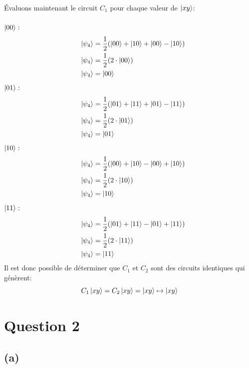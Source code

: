 \documentclass{article}
\begin{document}
Évaluons maintenant le circuit $C_1$ pour chaque valeur de $\ket{xy}$: \\ \\
$\ket{00}:$ \\
\begin{align*}
&&      \ket{\psi_4} &= \frac{1}{2}(\ket{00} + \ket{10} + \ket{00} - \ket{10}) \\
&&      \ket{\psi_4} &= \frac{1}{2}(2 \cdot \ket{00}) \\
&&      \ket{\psi_4} &= \ket{00} \\
\end{align*}
$\ket{01}:$ \\
\begin{align*}
&&      \ket{\psi_4} &= \frac{1}{2}(\ket{01} + \ket{11} + \ket{01} - \ket{11}) \\
&&      \ket{\psi_4} &= \frac{1}{2}(2 \cdot \ket{01}) \\
&&      \ket{\psi_4} &= \ket{01} \\
\end{align*}
$\ket{10}:$ \\
\begin{align*}
&&      \ket{\psi_4} &= \frac{1}{2}(\ket{00} + \ket{10} - \ket{00} + \ket{10}) \\
&&      \ket{\psi_4} &= \frac{1}{2}(2 \cdot \ket{10}) \\
&&      \ket{\psi_4} &= \ket{10} \\
\end{align*}
$\ket{11}:$ \\
\begin{align*}
&&      \ket{\psi_4} &= \frac{1}{2}(\ket{01} + \ket{11} - \ket{01} + \ket{11}) \\
&&      \ket{\psi_4} &= \frac{1}{2}(2 \cdot \ket{11}) \\
&&      \ket{\psi_4} &= \ket{11} \\
\end{align*}
Il est donc possible de déterminer que $C_1$ et $C_2$ sont des circuits identiques qui génèrent: \\
\[
C_1\ket{xy} = C_2\ket{xy} = \ket{xy} \mapsto \ket{xy}
\]

\section*{Question 2}
\subsection*{(a)}
\end{document}
